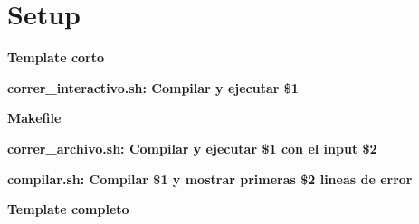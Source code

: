 \section{Setup}
    \textbf{Template corto}
    

    \textbf{correr\_interactivo.sh: Compilar y ejecutar \$1}
    
    
    \textbf{Makefile}
    
    
    \textbf{correr\_archivo.sh: Compilar y ejecutar \$1 con el input \$2}
    
    
    \textbf{compilar.sh: Compilar \$1 y mostrar primeras \$2 lineas de error}
    

    \textbf{Template completo}
    